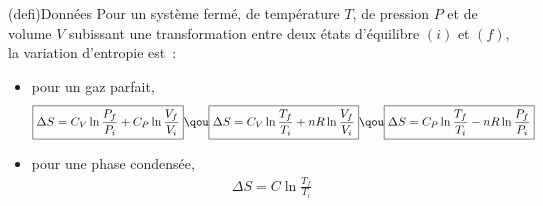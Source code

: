 \documentclass[a4paper, 10pt, final, garamond]{book}
\begin{document}
\setcounter{chapter}{3}


\chapter{}

\begin{tcn}(defi){Données}
	Pour un système fermé, de température $T$, de pression $P$ et de volume $V$
	subissant une transformation entre deux états d'équilibre $(i)$ et $(f)$, la
	variation d'entropie est~:
	\begin{itemize}
		\item pour un gaz parfait,
		      \begin{gather*}
			      \boxed{\Delta S = C_V \ln \frac{P_f}{P_i} + C_P \ln \frac{V_f}{V_i}}
			      \qou
			      \boxed{\Delta S = C_V \ln \frac{T_f}{T_i} + nR \ln \frac{V_f}{V_i}}
			      \qou
			      \boxed{\Delta S = C_P \ln \frac{T_f}{T_i} - nR \ln \frac{P_f}{P_i}}
		      \end{gather*}
		\item pour une phase condensée,
		      \begin{gather*}
			      \boxed{\Delta S = C \ln \frac{T_f}{T_i}}
		      \end{gather*}
	\end{itemize}
\end{tcn}

\resetQ


\resetQ


\resetQ


\resetQ


\resetQ


\resetQ

\end{document}
